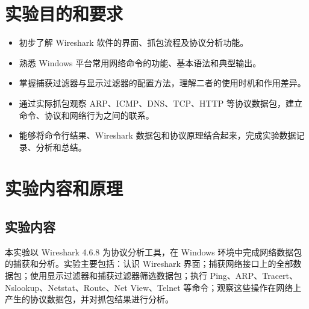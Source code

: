 \documentclass[UTF8,a4paper,zihao=-4]{ctexart}
\begin{document}
\vspace{1.0em}

\section{实验目的和要求}
\begin{itemize}
  \item 初步了解 Wireshark 软件的界面、抓包流程及协议分析功能。
  \item 熟悉 Windows 平台常用网络命令的功能、基本语法和典型输出。
  \item 掌握捕获过滤器与显示过滤器的配置方法，理解二者的使用时机和作用差异。
  \item 通过实际抓包观察 ARP、ICMP、DNS、TCP、HTTP 等协议数据包，建立命令、协议和网络行为之间的联系。
  \item 能够将命令行结果、Wireshark 数据包和协议原理结合起来，完成实验数据记录、分析和总结。
\end{itemize}

\section{实验内容和原理}
\subsection{实验内容}
本实验以 Wireshark 4.6.8 为协议分析工具，在 Windows 环境中完成网络数据包的捕获和分析。实验主要包括：认识 Wireshark 界面；捕获网络接口上的全部数据包；使用显示过滤器和捕获过滤器筛选数据包；执行 Ping、ARP、Tracert、Nslookup、Netstat、Route、Net View、Telnet 等命令；观察这些操作在网络上产生的协议数据包，并对抓包结果进行分析。
\end{document}
